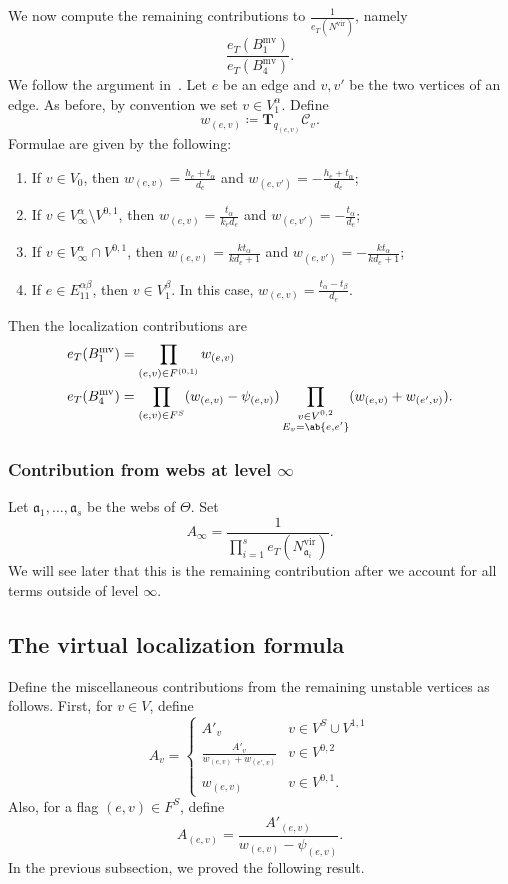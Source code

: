 \documentclass{amsart}
\theoremstyle{definition}
\theoremstyle{remark}
\theoremstyle{plain}
\theoremstyle{definition}
\theoremstyle{remark}
\newcommand{\T}{\mathbf{T}}
\newcommand{\mc}[1]{\mathcal{#1}}
\newcommand{\mf}[1]{\mathfrak{#1}}
\newcommand{\mr}[1]{\mathrm{#1}}
\newcommand{\1}{\mathbf{1}}
\newcommand{\2}{\mathbf{2}}
\newcommand{\3}{\mathbf{3}}
\newcommand{\vir}{\mr{vir}}
\newcommand{\mv}{\mr{mv}}
\begin{document}
We now compute the remaining contributions to $\frac{1}{e_T(N^{\vir})}$, namely
\[ \frac{e_T(B_1^{\mv})}{e_T(B_4^{\mv})}. \]
We follow the argument in~\cite[\S 4.1]{msp2}. Let $e$ be an edge and $v, v'$ be the two vertices of an edge. As before, by convention we set $v \in V_1^{\alpha}$. Define
\[ w_{(e,v)} \coloneqq \T_{q_{(e,v)}} \mc{C}_v. \]
Formulae are given by the following:
\begin{enumerate}
    \item If $v \in V_0$, then $w_{(e,v)} = \frac{h_e + t_{\alpha}}{d_e}$ and $w_{(e,v')} = -\frac{h_e+t_{\alpha}}{d_e}$;
    \item If $v \in V_{\infty}^{\alpha} \setminus V^{0,1}$, then $w_{(e,v)} = \frac{t_{\alpha}}{k_e d_e}$ and $w_{(e,v')} = -\frac{t_{\alpha}}{d_e}$;
    \item If $v \in V_{\infty}^{\alpha} \cap V^{0,1}$, then $w_{(e,v)} = \frac{kt_{\alpha}}{k d_e+1}$ and $w_{(e,v')} = -\frac{kt_{\alpha}}{k d_e+1}$;
    \item If $e \in E_{11}^{\alpha\beta}$, then $v \in V_1^{\beta}$. In this case, $w_{(e,v)} = \frac{t_{\alpha}-t_{\beta}}{d_e}$.
\end{enumerate}
Then the localization contributions are
\begin{align*}
    e_T(B_1^{\mv}) &= \prod_{(e,v) \in F^{(0,1)}} w_{(e,v)} \\
    e_T(B_4^{\mv}) &= \prod_{(e,v) \in F^S} (w_{(e,v)} - \psi_{(e,v)}) \prod_{\substack{ v \in V^{0,2} \\ E_v = \ab\{e,e'\} }} (w_{(e,v)} + w_{(e',v)}).
\end{align*}

\subsubsection{Contribution from webs at level $\infty$}%
\label{ssub:Contribution from webs at level infty}

Let $\mf{a}_1, \ldots, \mf{a}_s$ be the webs of $\Theta$. 
Set
\[ A_{\infty} = \frac{1}{\prod_{i=1}^s e_T(N_{\mf{a}_i}^{\vir})}. \]
We will see later that this is the remaining contribution after we account for all terms outside of level $\infty$.

\subsection{The virtual localization formula}%
\label{sub:The virtual localization formula}

Define the miscellaneous contributions from the remaining unstable vertices as follows. First, for $v \in V$, define
\[ A_v = \begin{cases}
    A'_v & v \in V^S \cup V^{1,1} \\
    \frac{A'_v}{w_{(e,v)} + w_{(e',v)}} & v \in V^{0,2} \\
    w_{(e,v)} & v \in V^{0,1}.
\end{cases}
\]
Also, for a flag $(e,v) \in F^S$, define
\[ A_{(e,v)} = \frac{A'_{(e,v)}}{w_{(e,v)} - \psi_{(e,v)}}. \]
In the previous subsection, we proved the following result.
\end{document}
